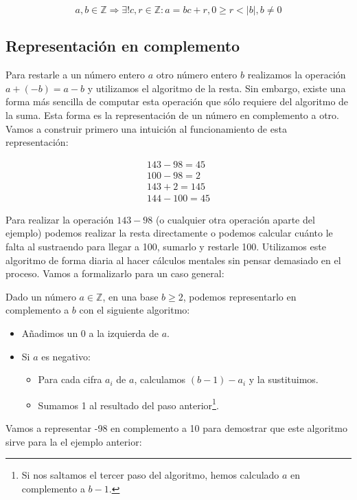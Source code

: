 \[a,b \in\mathbb{Z} \Rightarrow \exists! c,r \in\mathbb{Z} : a = bc + r, 0 \geq r < |b|, b \neq 0\]

\subsection{Representación en complemento}

Para restarle a un número entero $a$ otro número entero $b$ realizamos la operación $a + (-b) = a - b$ y utilizamos el algoritmo de la resta.
Sin embargo, existe una forma más sencilla de computar esta operación que sólo requiere del algoritmo de la suma.
Esta forma es la representación de un número en complemento a otro.
Vamos a construir primero una intuición al funcionamiento de esta representación:

\begin{align*}
	143 - 98  = 45  \\
	100 - 98  = 2   \\
	143 + 2   = 145 \\
	144 - 100 = 45
\end{align*}

Para realizar la operación $143 - 98$ (o cualquier otra operación aparte del ejemplo) podemos realizar la resta directamente o podemos calcular cuánto le falta al sustraendo para llegar a 100, sumarlo y restarle 100.
Utilizamos este algoritmo de forma diaria al hacer cálculos mentales sin pensar demasiado en el proceso.
Vamos a formalizarlo para un caso general:

Dado un número $a \in\mathbb{Z}$, en una base $b \geq 2$, podemos representarlo en complemento a $b$ con el siguiente algoritmo:

\begin{itemize}
	\item Añadimos un 0 a la izquierda de $a$.
	\item Si $a$ es negativo:
	\begin{itemize}
		\item Para cada cifra $a_i$ de $a$, calculamos $(b-1) - a_i$ y la sustituimos.
		\item Sumamos 1 al resultado del paso anterior\footnote{%
			Si nos saltamos el tercer paso del algoritmo, hemos calculado $a$ en complemento a $b-1$.
		}.
	\end{itemize}
\end{itemize}

Vamos a representar -98 en complemento a 10 para demostrar que este algoritmo sirve para la el ejemplo anterior:

